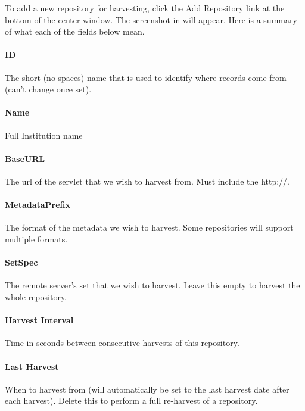 \documentclass[a4paper,11pt]{article}
\begin{document}
To add a new repository for harvesting, click the Add Repository link at the bottom of the center window. The screenshot in  will appear. Here is a summary of what each of the fields below mean.

\paragraph{ID}

The short (no spaces) name that is used to identify where records come from (can't change once set). 

\paragraph{Name} 

Full Institution name 

\paragraph{BaseURL}

The url of the servlet that we wish to harvest from. Must include the http://. 

\paragraph{MetadataPrefix}

The format of the metadata we wish to harvest. Some repositories will support multiple formats. 

\paragraph{SetSpec}

The remote server's set that we wish to harvest. Leave this empty to harvest the whole repository. 

\paragraph{Harvest Interval}

Time in seconds between consecutive harvests of this repository. 

\paragraph{Last Harvest} 

When to harvest from (will automatically be set to the last harvest date after each harvest). Delete this to perform a full re-harvest of a repository.
\end{document}
